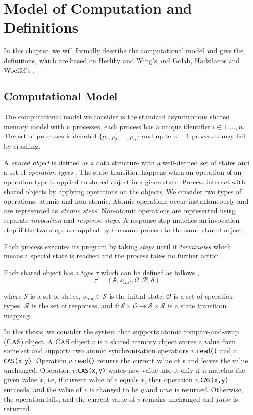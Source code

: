 
\chapter{Model of Computation and Definitions}
In this chapter, we will formally describe the computational model and give the definitions, which are based on Herlihy and Wing's \cite{Herlihy:1990:LCC:78969.78972} and Golab, Hadzilacos and Woelfel's \cite{InProc-GHHW2007a}.

\section{Computational Model}
The computational model we consider is the standard asynchronous shared memory model with $n$ processes, each process has a unique identifier $i \in {1,...,n}$. The set of processes is denoted $\{p_1, p_2,...,p_n\}$ and up to $n-1$ processes may fail by crashing.

A \emph{shared object} is defined as a data structure with a well-defined set of states and a set of \emph{operation types} \cite{InProc-GHHW2007a}. The state transition happens when an operation of an operation type is applied to shared object in a given state. Process interact with shared objects by applying operations on the objects. We consider two types of operations: atomic and non-atomic. Atomic operations occur instantaneously and are represented as \emph{atomic steps}. Non-atomic operations are represented using separate \emph{invocation} and \emph{response steps}. A response step matches an invocation step if the two steps are applied by the same process to the same shared
object.

Each process executes its program by taking \emph{steps} until it \emph{terminates} which means a special state is reached and the process takes no further action. 

Each shared object has a $type$ $\tau$ which can be defined as follows \cite{InProc-GHHW2007a},
$$\tau = (\mathcal{S}, s_{init},\mathcal{O},\mathcal{R} ,\delta )$$

where $\mathcal{S}$ is a set of states, $s_{init} \in \mathcal{S}$ is the initial state, $\mathcal{O}$ is a set of operation types, $\mathcal{R}$ is the set of responses, and $\delta :\mathcal{S} \times \mathcal{O} \to \mathcal{S} \times \mathcal{R}$ is a state transition mapping.

In this thesis, we consider the system that supports atomic compare-and-swap (CAS) object. A CAS object $v$ is a shared memory object stores a value from some set and supports two atomic synchronization operations $v.$\texttt{read()} and $v.$\texttt{CAS(x,y)}. Operation $v.$\texttt{read()} returns the current value of $v$ and leaves the value unchanged. Operation $v.$\texttt{CAS(x,y)} writes new value into it only if it matches the given value $x$, i.e, if current value of $v$ equals $x$, then operation $v.$\texttt{CAS(x,y)} succeeds, and the value of $v$ is changed to be $y$ and $true$ is returned. Otherwise, the operation fails, and the current value of $v$ remains unchanged and $false$ is returned.

